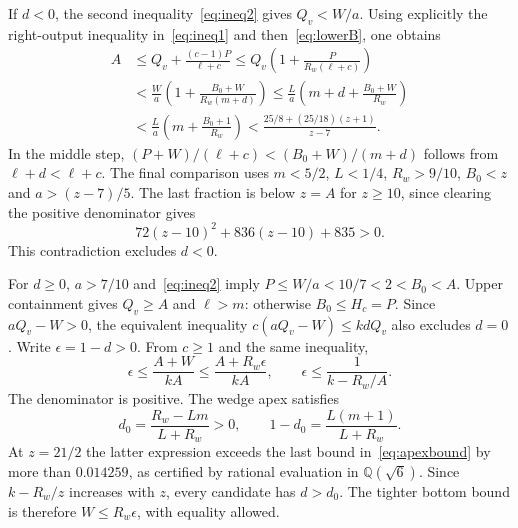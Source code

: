 If $d<0$, the second inequality~\eqref{eq:ineq2} gives $Q_v<W/a$.
Using explicitly the right-output inequality in~\eqref{eq:ineq1} and
then~\eqref{eq:lowerB}, one obtains
\begin{align}
 A&\le Q_v+\frac{(c-1)P}{\ell+c}
 \le Q_v\left(1+\frac{P}{R_w(\ell+c)}\right)\nonumber\\
 &<\frac{W}{a}\left(1+\frac{B_0+W}{R_w(m+d)}\right)
 \le\frac{L}{a}\left(m+d+\frac{B_0+W}{R_w}\right)\nonumber\\
 &<\frac{L}{a}\left(m+\frac{B_0+1}{R_w}\right)
 <\frac{25/8+(25/18)(z+1)}{z-7}.
\end{align}
In the middle step, $(P+W)/(\ell+c)<(B_0+W)/(m+d)$ follows from
$\ell+d<\ell+c$. The final comparison uses
$m<5/2$, $L<1/4$, $R_w>9/10$, $B_0<z$ and $a>(z-7)/5$.
The last fraction is below $z=A$ for $z\ge10$, since clearing the
positive denominator gives
\begin{equation}
 72(z-10)^2+836(z-10)+835>0.
\end{equation}
This contradiction excludes $d<0$.

For $d\ge0$, $a>7/10$ and~\eqref{eq:ineq2} imply
$P\le W/a<10/7<2<B_0<A$. Upper containment gives $Q_v\ge A$ and
$\ell>m$: otherwise $B_0\le H_c=P$. Since $aQ_v-W>0$, the equivalent
inequality $c(aQ_v-W)\le kdQ_v$ also excludes $d=0$. Write
$\epsilon=1-d>0$. From $c\ge1$ and the same inequality,
\begin{equation}
 \epsilon\le\frac{A+W}{kA}
 \le\frac{A+R_w\epsilon}{kA},\qquad
 \epsilon\le\frac1{k-R_w/A}.\label{eq:apexbound}
\end{equation}
The denominator is positive. The wedge apex satisfies
\begin{equation}
 d_0=\frac{R_w-Lm}{L+R_w}>0,\qquad
 1-d_0=\frac{L(m+1)}{L+R_w}.
\end{equation}
At $z=21/2$ the latter expression exceeds the last bound
in~\eqref{eq:apexbound} by more than $0.014259$, as certified by rational
evaluation in $\mathbb Q(\sqrt6)$. Since $k-R_w/z$ increases with $z$,
every candidate has $d>d_0$. The tighter bottom bound is therefore
$W\le R_w\epsilon$, with equality allowed.

